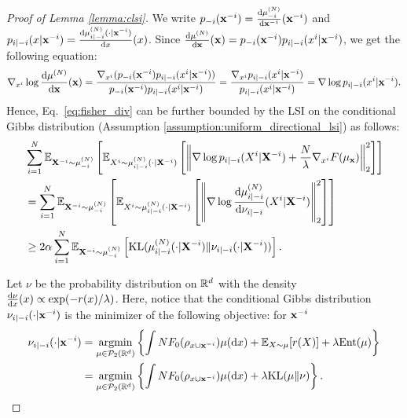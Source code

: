 \begin{proof}[Proof of Lemma \ref{lemma:clsi}]
    We write $p_{-i}(\vx^{-i})=\frac{\rd \pow[\mu,N]_{-i}}{\rd \vx^{-i}}(\vx^{-i})$ and $p_{i|-i}(x|\vx^{-i})=\frac{\rd \pow[\mu,N]_{i|-i}(\cdot|\vx^{-i})}{\rd x}(x)$.
    Since $\frac{\rd \pow[\mu,N]}{\rd \vx}(\vx) = p_{-i}(\vx^{-i}) p_{i|-i}(x^i|\vx^{-i})$, we get the following equation:
    \begin{equation*}
        \nabla_{x^i} \log \frac{\rd \pow[\mu,N]}{\rd \vx}(\vx)
        = \frac{\nabla_{x^i}(p_{-i}(\vx^{-i}) p_{i|-i}(x^{i}|\vx^{-i}))}{p_{-i}(\vx^{-i}) p_{i|-i}(x^{i}|\vx^{-i})}
        = \frac{\nabla_{x^i}p_{i|-i}(x^i|\vx^{-i})}{p_{i|-i}(x^i|\vx^{-i})}
        = \nabla \log p_{i|-i}(x^i|\vx^{-i}).
    \end{equation*}
    Hence, Eq.~\eqref{eq:fisher_div} can be further bounded by the LSI on the conditional Gibbs distribution (Assumption \ref{assumption:uniform_directional_lsi}) as follows: 
    \begin{align}
        &\sum_{i=1}^N \bE_{\vX^{-i} \sim \pow[\mu,N]_{-i}} \left[ \bE_{X^i \sim \pow[\mu,N]_{i|-i}(\cdot |\vX^{-i})}\left[ \left\| \nabla \log p_{i|-i}(X^i|\vX^{-i}) + \frac{N}{\lambda}\nabla_{x^i}F(\mu_\vx)\right\|_2^2 \right]\right] \notag \\
        &=\sum_{i=1}^N \bE_{\vX^{-i} \sim \pow[\mu,N]_{-i}} \left[ \bE_{X^i \sim \pow[\mu,N]_{i|-i}(\cdot|\vX^{-i})}\left[ \left\| \nabla \log \frac{\rd \pow[\mu,N]_{i|-i}}{\rd \nu_{i|-i}}(X^i|\vX^{-i}) \right\|_2^2 \right]\right] \notag \\
        &\geq 2\alpha  \sum_{i=1}^N \bE_{\vX^{-i} \sim \pow[\mu,N]_{-i}} \left[ \KL( \pow[\mu,N]_{i|-i}(\cdot|\vX^{-i}) \| \nu_{i|-i}(\cdot|\vX^{-i})) \right].  \label{eq:fisher_div_eval}
    \end{align}

    Let $\nu$ be the probability distribution on $\mathbb{R}^d$ with the density $\frac{\mathrm{d} \nu}{\mathrm{d} x}(x) \propto \exp(-r(x)/\lambda)$. Here, notice that the conditional Gibbs distribution $\nu_{i|-i}(\cdot|\mathbf{x}^{-i})$ is the minimizer of the following objective: for $\mathbf{x}^{-i}$
    \begin{align*} 
        \nu_{i|-i}(\cdot|\mathbf{x}^{-i}) 
        &= \mathop{\mathrm{argmin}}_{\mu \in \mathcal{P}_2(\mathbb{R}^d)}\left\{
        \int NF_0(\rho_{x\cup\mathbf{x}^{-i}})\mu(\mathrm{d} x) 
        + \mathbb{E}_{X\sim \mu}[r(X)] + \lambda \mathrm{Ent}(\mu)
        \right\} \\
        &= \mathop{\mathrm{argmin}}_{\mu \in \mathcal{P}_2(\mathbb{R}^d)}\left\{
        \int NF_0(\rho_{x\cup\mathbf{x}^{-i}})\mu(\mathrm{d} x) 
        + \lambda\mathrm{KL}(\mu\|\nu)
        \right\}.
    \end{align*}


\end{proof}

